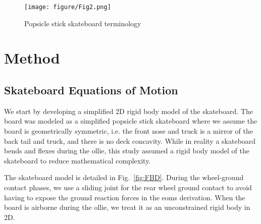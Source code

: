 \documentclass[default,iicol,pdflatex]{sn-jnl}
\begin{document}
\begin{figure}[t]
    \texttt{[image: figure/Fig2.png]}
    \caption[Skateboard terminology]{Popsicle stick skateboard terminology}
    \label{fig:skateboard terminology}
\end{figure}

\section{Method}

\subsection{Skateboard Equations of Motion}
We start by developing a simplified 2D rigid body model of the skateboard.
The board was modeled as a simplified popsicle stick skateboard where we assume the board is geometrically symmetric, i.e. the front nose and truck is a mirror of the back tail and truck, and there is no deck concavity.
While in reality a skateboard bends and flexes during the ollie, this study assumed a rigid body model of the skateboard to reduce mathematical complexity.

The skateboard model is detailed in Fig.~\ref{fig:FBD}. During the wheel-ground contact phases, we use a sliding joint for the rear wheel ground contact to avoid having to expose the ground reaction forces in the \glspl{eom} derivation.
When the board is airborne during the ollie, we treat it as an unconstrained rigid body in 2D. 
\end{document}
